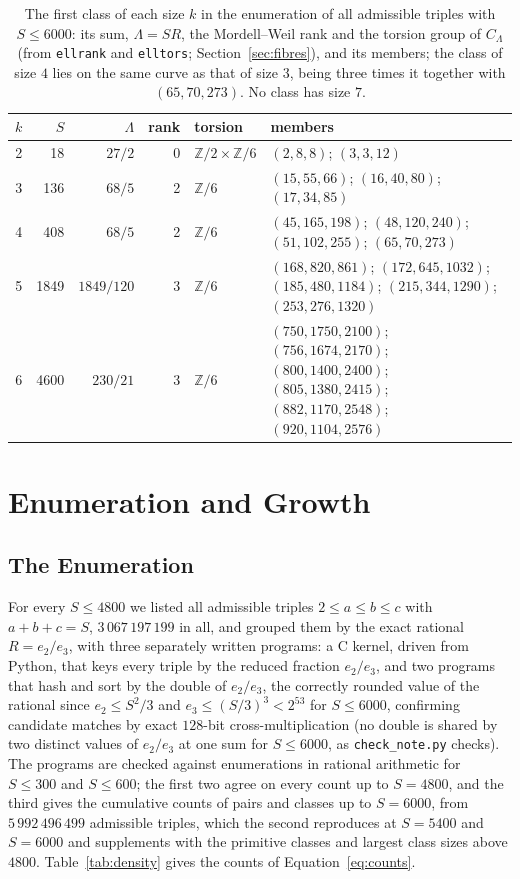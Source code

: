 \documentclass[10pt]{article}
\newcommand{\Z}{\mathbb{Z}}
\begin{document}
\begin{table}[t]
\centering\small
\begin{tabular}{@{}rrrrl>{\raggedright\arraybackslash}p{}@{}}
\toprule
$k$ & $S$ & $\Lambda$ & rank & torsion & members\\
\midrule
2 & 18 & $27/2$ & 0 & $\Z/2\times\Z/6$ & $(2,8,8)$; $(3,3,12)$ \\
3 & 136 & $68/5$ & 2 & $\Z/6$ & $(15,55,66)$; $(16,40,80)$; $(17,34,85)$ \\
4 & 408 & $68/5$ & 2 & $\Z/6$ & $(45,165,198)$; $(48,120,240)$; $(51,102,255)$; $(65,70,273)$ \\
5 & 1849 & $1849/120$ & 3 & $\Z/6$ & $(168,820,861)$; $(172,645,1032)$; $(185,480,1184)$; $(215,344,1290)$; $(253,276,1320)$ \\
6 & 4600 & $230/21$ & 3 & $\Z/6$ & $(750,1750,2100)$; $(756,1674,2170)$; $(800,1400,2400)$; $(805,1380,2415)$; $(882,1170,2548)$; $(920,1104,2576)$ \\
\bottomrule
\end{tabular}
\caption{The first class of each size $k$ in the enumeration of all admissible triples with $S\le6000$: its sum, $\Lambda=SR$, the Mordell--Weil rank and the torsion group of $C_\Lambda$ (from \texttt{ellrank} and \texttt{elltors}; Section~\ref{sec:fibres}), and its members; the class of size $4$ lies on the same curve as that of size $3$, being three times it together with $(65,70,273)$. No class has size $7$.}\label{tab:fibres}
\end{table}

\section{Enumeration and Growth}\label{sec:growth}

\subsection{The Enumeration}
For every $S\le4800$ we listed all admissible triples $2\le a\le b\le c$ with $a+b+c=S$, $3\,067\,197\,199$ in all, and grouped them by the exact rational $R=e_2/e_3$, with three separately written programs: a C kernel, driven from Python, that keys every triple by the reduced fraction $e_2/e_3$, and two programs that hash and sort by the double of $e_2/e_3$, the correctly rounded value of the rational since $e_2\le S^2/3$ and $e_3\le(S/3)^3<2^{53}$ for $S\le6000$, confirming candidate matches by exact $128$-bit cross-multiplication (no double is shared by two distinct values of $e_2/e_3$ at one sum for $S\le6000$, as \texttt{check\_note.py} checks). The programs are checked against enumerations in rational arithmetic for $S\le300$ and $S\le600$; the first two agree on every count up to $S=4800$, and the third gives the cumulative counts of pairs and classes up to $S=6000$, from $5\,992\,496\,499$ admissible triples, which the second reproduces at $S=5400$ and $S=6000$ and supplements with the primitive classes and largest class sizes above $4800$. Table~\ref{tab:density} gives the counts of Equation~\eqref{eq:counts}.
\end{document}
